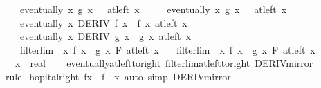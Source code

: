 \begin{isabellebody}
\ \ \ \ eventually\ {\isacharparenleft}{\kern0pt}{\isasymlambda}x{\isachardot}{\kern0pt}\ g\ x\ {\isasymnoteq}\ {}{\isacharparenright}{\kern0pt}\ {\isacharparenleft}{\kern0pt}at{\isacharunderscore}{\kern0pt}left\ x{\isacharparenright}{\kern0pt}\ {\isasymLongrightarrow}\isanewline
\ \ \ \ eventually\ {\isacharparenleft}{\kern0pt}{\isasymlambda}x{\isachardot}{\kern0pt}\ g{\isacharprime}{\kern0pt}\ x\ {\isasymnoteq}\ {}{\isacharparenright}{\kern0pt}\ {\isacharparenleft}{\kern0pt}at{\isacharunderscore}{\kern0pt}left\ x{\isacharparenright}{\kern0pt}\ {\isasymLongrightarrow}\isanewline
\ \ \ \ eventually\ {\isacharparenleft}{\kern0pt}{\isasymlambda}x{\isachardot}{\kern0pt}\ DERIV\ f\ x\ {\isacharcolon}{\kern0pt}{\isachargreater}{\kern0pt}\ f{\isacharprime}{\kern0pt}\ x{\isacharparenright}{\kern0pt}\ {\isacharparenleft}{\kern0pt}at{\isacharunderscore}{\kern0pt}left\ x{\isacharparenright}{\kern0pt}\ {\isasymLongrightarrow}\isanewline
\ \ \ \ eventually\ {\isacharparenleft}{\kern0pt}{\isasymlambda}x{\isachardot}{\kern0pt}\ DERIV\ g\ x\ {\isacharcolon}{\kern0pt}{\isachargreater}{\kern0pt}\ g{\isacharprime}{\kern0pt}\ x{\isacharparenright}{\kern0pt}\ {\isacharparenleft}{\kern0pt}at{\isacharunderscore}{\kern0pt}left\ x{\isacharparenright}{\kern0pt}\ {\isasymLongrightarrow}\isanewline
\ \ \ \ filterlim\ {\isacharparenleft}{\kern0pt}{\isasymlambda}\ x{\isachardot}{\kern0pt}\ {\isacharparenleft}{\kern0pt}f{\isacharprime}{\kern0pt}\ x\ {\isacharslash}{\kern0pt}\ g{\isacharprime}{\kern0pt}\ x{\isacharparenright}{\kern0pt}{\isacharparenright}{\kern0pt}\ F\ {\isacharparenleft}{\kern0pt}at{\isacharunderscore}{\kern0pt}left\ x{\isacharparenright}{\kern0pt}\ {\isasymLongrightarrow}\isanewline
\ \ filterlim\ {\isacharparenleft}{\kern0pt}{\isasymlambda}\ x{\isachardot}{\kern0pt}\ f\ x\ {\isacharslash}{\kern0pt}\ g\ x{\isacharparenright}{\kern0pt}\ F\ {\isacharparenleft}{\kern0pt}at{\isacharunderscore}{\kern0pt}left\ x{\isacharparenright}{\kern0pt}{\isachardoublequoteclose}\isanewline
\ \ \ x\ {\isacharcolon}{\kern0pt}{\isacharcolon}{\kern0pt}\ real\isanewline
%
\isadelimproof
\ \ %
\endisadelimproof
%
\isatagproof
{}\isamarkupfalse%
\ eventually{\isacharunderscore}{\kern0pt}at{\isacharunderscore}{\kern0pt}left{\isacharunderscore}{\kern0pt}to{\isacharunderscore}{\kern0pt}right\ filterlim{\isacharunderscore}{\kern0pt}at{\isacharunderscore}{\kern0pt}left{\isacharunderscore}{\kern0pt}to{\isacharunderscore}{\kern0pt}right\ DERIV{\isacharunderscore}{\kern0pt}mirror\isanewline
\ \ \isamarkupfalse%
\ {\isacharparenleft}{\kern0pt}rule\ lhopital{\isacharunderscore}{\kern0pt}right{\isacharbrackleft}{\kern0pt}\ f{\isacharprime}{\kern0pt}{\isacharequal}{\kern0pt}{\isachardoublequoteopen}{\isasymlambda}x{\isachardot}{\kern0pt}\ {\isacharminus}{\kern0pt}\ f{\isacharprime}{\kern0pt}\ {\isacharparenleft}{\kern0pt}{\isacharminus}{\kern0pt}\ x{\isacharparenright}{\kern0pt}{\isachardoublequoteclose}{\isacharbrackright}{\kern0pt}{\isacharparenright}{\kern0pt}\ {\isacharparenleft}{\kern0pt}auto\ simp{\isacharcolon}{\kern0pt}\ DERIV{\isacharunderscore}{\kern0pt}mirror{\isacharparenright}{\kern0pt}%

\end{isabellebody}

